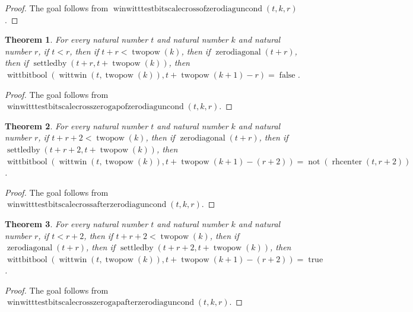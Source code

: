 \documentclass[11pt]{article}
\newtheorem{theorem}{Theorem}[section]
\theoremstyle{definition}
\begin{document}
\begin{proof}
The goal follows from \(\operatorname{winwitttestbitscalecrossofzerodiaguncond}(t, k, r)\).
\end{proof}
\begin{theorem}
\label{ll:paper:winwitt-testbit-scale-cross-zero-gap-of-zero-diag-uncond}
For every natural number \(t\) and natural number \(k\) and natural number \(r\), if \(t < r\), then if \(t + r < \operatorname{twopow}(k)\), then if \(\operatorname{zerodiagonal}(t + r)\), then if \(\operatorname{settledby}(t + r, t + \operatorname{twopow}(k))\), then \(\operatorname{wittbitbool}(\operatorname{wittwin}(t, \operatorname{twopow}(k)), t + \operatorname{twopow}(k + 1) - r) = \operatorname{false}\).
\end{theorem}
\begin{proof}
The goal follows from \(\operatorname{winwitttestbitscalecrosszerogapofzerodiaguncond}(t, k, r)\).
\end{proof}
\begin{theorem}
\label{ll:paper:winwitt-testbit-scale-cross-after-zero-diag-uncond}
For every natural number \(t\) and natural number \(k\) and natural number \(r\), if \(t + r + 2 < \operatorname{twopow}(k)\), then if \(\operatorname{zerodiagonal}(t + r)\), then if \(\operatorname{settledby}(t + r + 2, t + \operatorname{twopow}(k))\), then \(\operatorname{wittbitbool}(\operatorname{wittwin}(t, \operatorname{twopow}(k)), t + \operatorname{twopow}(k + 1) - (r + 2)) = \operatorname{not}(\operatorname{rhcenter}(t, r + 2))\).
\end{theorem}
\begin{proof}
The goal follows from \(\operatorname{winwitttestbitscalecrossafterzerodiaguncond}(t, k, r)\).
\end{proof}
\begin{theorem}
\label{ll:paper:winwitt-testbit-scale-cross-zero-gap-after-zero-diag-uncond}
For every natural number \(t\) and natural number \(k\) and natural number \(r\), if \(t < r + 2\), then if \(t + r + 2 < \operatorname{twopow}(k)\), then if \(\operatorname{zerodiagonal}(t + r)\), then if \(\operatorname{settledby}(t + r + 2, t + \operatorname{twopow}(k))\), then \(\operatorname{wittbitbool}(\operatorname{wittwin}(t, \operatorname{twopow}(k)), t + \operatorname{twopow}(k + 1) - (r + 2)) = \operatorname{true}\).
\end{theorem}
\begin{proof}
The goal follows from \(\operatorname{winwitttestbitscalecrosszerogapafterzerodiaguncond}(t, k, r)\).
\end{proof}
\end{document}
